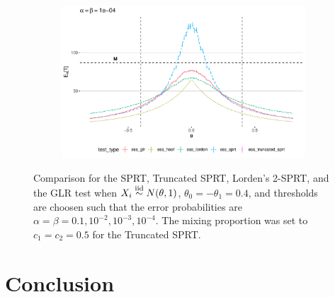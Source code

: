 \documentclass[11pt]{article}
\begin{document}
\begin{figure}
\begin{subfigure}{0.49\textwidth}
\end{subfigure}
\hfill
\begin{subfigure}{0.49\textwidth}
    \includegraphics[width=\textwidth]{images/ess_alpha1e4}
\end{subfigure}

\caption{Comparison for the SPRT, Truncated SPRT, Lorden's 2-SPRT, and the GLR test when $X_i \overset{\text{iid}}\sim N(\theta, 1)$, $\theta_0 = -\theta_1 = 0.4$, and thresholds are choosen such that the error probabilities are $\alpha = \beta = 0.1, 10^{-2}, 10^{-3}, 10^{-4}$. The mixing proportion was set to $c_1 = c_2 = 0.5$ for the Truncated SPRT. }
\end{figure}

\section{Conclusion}



\end{document}
